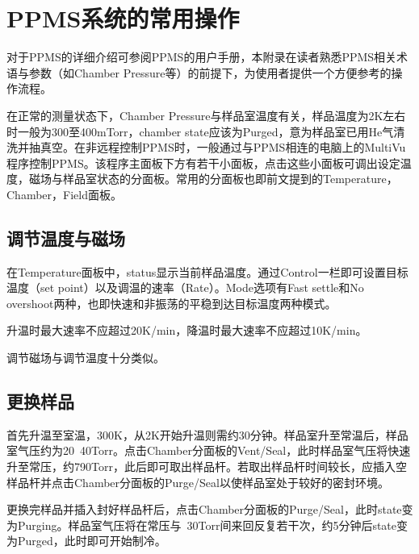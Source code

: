 
\chapter{PPMS系统的常用操作} %
\label{cha:ppms系统的常用操作}
    对于PPMS的详细介绍可参阅PPMS的用户手册，本附录在读者熟悉PPMS相关术语与参数（如Chamber Pressure等）的前提下，为使用者提供一个方便参考的操作流程。

    在正常的测量状态下，Chamber Pressure与样品室温度有关，样品温度为2K左右时一般为300至400mTorr，chamber state应该为Purged，意为样品室已用He气清洗并抽真空。在非远程控制PPMS时，一般通过与PPMS相连的电脑上的MultiVu程序控制PPMS。该程序主面板下方有若干小面板，点击这些小面板可调出设定温度，磁场与样品室状态的分面板。常用的分面板也即前文提到的Temperature，Chamber，Field面板。

    \section{调节温度与磁场} %
    \label{sec:调节温度}
        在Temperature面板中，status显示当前样品温度。通过Control一栏即可设置目标温度（set point）以及调温的速率（Rate）。Mode选项有Fast settle和No overshoot两种，也即快速和非振荡的平稳到达目标温度两种模式。

        升温时最大速率不应超过20K/min，降温时最大速率不应超过10K/min。


        调节磁场与调节温度十分类似。

    \section{更换样品} %
    \label{sec:更换样品}
        首先升温至室温，300K，从2K开始升温则需约30分钟。样品室升至常温后，样品室气压约为20~40Torr。点击Chamber分面板的Vent/Seal，此时样品室气压将快速升至常压，约790Torr，此后即可取出样品杆。若取出样品杆时间较长，应插入空样品杆并点击Chamber分面板的Purge/Seal以使样品室处于较好的密封环境。

        更换完样品并插入封好样品杆后，点击Chamber分面板的Purge/Seal，此时state变为Purging。样品室气压将在常压与~30Torr间来回反复若干次，约5分钟后state变为Purged，此时即可开始制冷。















